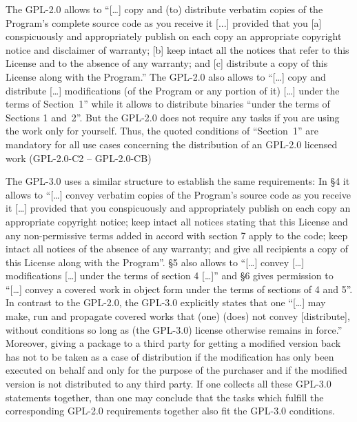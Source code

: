 The GPL-2.0 allows to \enquote{[\ldots] copy and (to) distribute verbatim copies
of the Program's complete source code as you receive it [...] provided that
you [a] conspicuously and appropriately publish on each copy an appropriate
copyright notice and disclaimer of warranty; [b] keep intact all the notices
that refer to this License and to the absence of any warranty; and [c]
distribute a copy of this License along with the Program.} The
GPL-2.0 also allows to \enquote{[\ldots] copy and distribute [\ldots]
modifications (of the Program or any portion of it) [\ldots] under the terms
of Section~1} while it allows to distribute binaries
\enquote{under the terms of Sections 1 and~2}. But the GPL-2.0
does not require any tasks if you are using the work only for yourself. Thus,
the quoted conditions of \enquote{Section~1} are mandatory for all use cases
concerning the distribution of an GPL-2.0 licensed work (GPL-2.0-C2 --
GPL-2.0-CB)
  
\label{Gpl3ConditionsDistri}
The GPL-3.0 uses a similar structure to establish the same requirements: In §4
it allows to \enquote{[\ldots] convey verbatim copies of the Program's source
code as you receive it [\ldots] provided that you conspicuously and
appropriately publish on each copy an appropriate copyright notice; keep
intact all notices stating that this License and any non-permissive terms
added in accord with section 7 apply to the code; keep intact all notices of
the absence of any warranty; and give all recipients a copy of this License
along with the Program}. §5 also allows to \enquote{[\ldots] convey [\ldots]
modifications [\ldots] under the terms of section 4 [\ldots]} and §6 gives
permission to \enquote{[\ldots] convey a covered work in object form under the
terms of sections of 4 and 5}. In contrast to the
GPL-2.0, the GPL-3.0 explicitly states that one \enquote{[\ldots] may make, run
and propagate covered works that (one) (does) not convey [distribute], without
conditions so long as (the GPL-3.0) license otherwise remains in
force.}
Moreover, giving a package to a third party for getting a modified version back
has not to be taken as a case of distribution if the modification has only been
executed on behalf and only for the purpose of the purchaser and if the modified
version is not distributed to any third party. If one collects
all these GPL-3.0 statements together, than one may conclude that the tasks
which fulfill the corresponding GPL-2.0 requirements together also fit the
GPL-3.0 conditions.
  
